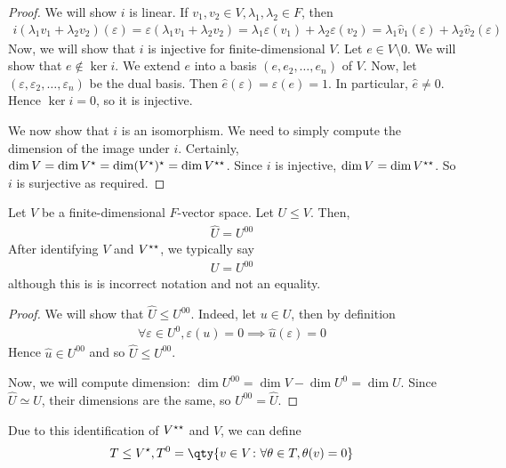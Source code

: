 \begin{proof}
	We will show $i$ is linear.
	If $v_1, v_2 \in V, \lambda_1, \lambda_2 \in F$, then
	\begin{align*}
		i(\lambda_1 v_1 + \lambda_2 v_2) (\varepsilon) = \varepsilon(\lambda_1 v_1 + \lambda_2 v_2) = \lambda_1 \varepsilon(v_1) + \lambda_2 \varepsilon(v_2) = \lambda_1 \hat v_1(\varepsilon) + \lambda_2 \hat v_2(\varepsilon)
	\end{align*}
	Now, we will show that $i$ is injective for finite-dimensional $V$.
	Let $e \in V \setminus \qty{0}$.
	We will show that $e \not\in \ker i$.
	We extend $e$ into a basis $(e, e_2, \dots, e_n)$ of $V$.
	Now, let $(\varepsilon, \varepsilon_2, \dots, \varepsilon_n)$ be the dual basis.
	Then $\hat e(\varepsilon) = \varepsilon(e) = 1$.
	In particular, $\hat e \neq 0$.
	Hence $\ker i = \qty{0}$, so it is injective.

	We now show that $i$ is an isomorphism.
	We need to simply compute the dimension of the image under $i$.
	Certainly, $\dim V = \dim V^\star = \dim (V^\star)^\star = \dim V^{\star\star}$.
	Since $i$ is injective, $\dim V = \dim V^{\star\star}$.
	So $i$ is surjective as required.
\end{proof}
\begin{lemma}
	Let $V$ be a finite-dimensional $F$-vector space.
	Let $U \leq V$.
	Then,
	\begin{align*}
		\hat U = U^{00}
	\end{align*}
	After identifying $V$ and $V^{\star\star}$, we typically say
	\begin{align*}
		U = U^{00}
	\end{align*}
	although this is is incorrect notation and not an equality.
\end{lemma}
\begin{proof}
	We will show that $\hat U \leq U^{00}$.
	Indeed, let $u \in U$, then by definition
	\begin{align*}
		\forall \varepsilon \in U^0, \varepsilon(u) = 0 \implies \hat u(\varepsilon) = 0
	\end{align*}
	Hence $\hat u \in U^{00}$ and so $\hat U \leq U^{00}$.

	Now, we will compute dimension:	$\dim U^{00} = \dim V - \dim U^0 = \dim U$.
	Since $\hat U \simeq U$, their dimensions are the same, so $U^{00} = \hat U$.
\end{proof}
\begin{remark}
	Due to this identification of $V^{\star\star}$ and $V$, we can define
	\begin{align*}
		T \leq V^\star, T^0 = \qty{v \in V \colon \forall \theta \in T, \theta(v) = 0}
	\end{align*}
\end{remark}
